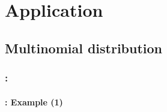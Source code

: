 \documentclass[xcolor=table]{beamer}
\begin{document}
\section{Application}

\begin{frame}
	\frametitle{\insertshortsubtitle}
	\framesubtitle{\insertsection}
	
	
\end{frame}

\subsection{Multinomial distribution}

\begin{frame}
	\frametitle{\insertshortsubtitle: \insertsection}
	\framesubtitle{\insertsubsection: Example (1)}
	

\end{frame}
\end{document}
